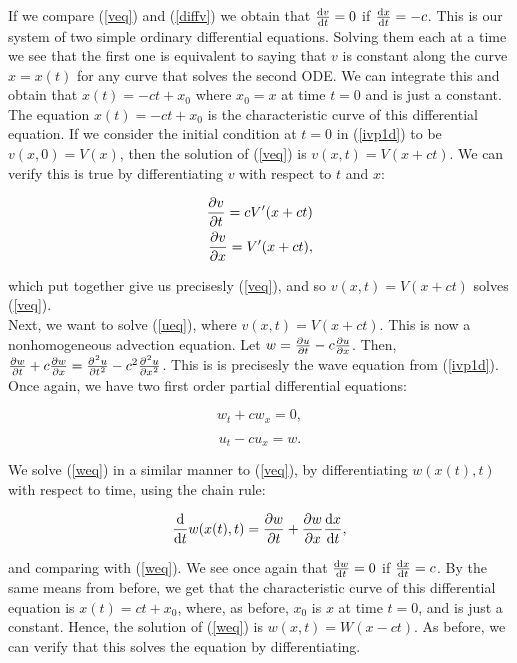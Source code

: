\documentclass[a4paper, 12pt]{article}
\numberwithin{equation}{section}
\begin{document}
If we compare (\ref{veq}) and (\ref{diffv}) we obtain that $\diff{v}{t}=0$ if $\diff{x}{t}=-c$. This is our system of two simple ordinary differential 
equations. Solving them each at a time we see that the first one is equivalent to saying that $v$ is constant along the curve $x=x(t)$ for any curve that 
solves the second ODE. We can integrate this and obtain that $x(t)=-ct+x_0$ where $x_0=x$ at time $t=0$ and is just a constant. The equation $x(t)=-ct+x_0$
is the characteristic curve of this differential equation. If we consider the initial condition at $t=0$ in (\ref{ivp1d}) to be $v(x,0)=V(x)$, then the 
solution of (\ref{veq}) is $v(x,t)=V(x+ct)$. We can verify this is true by differentiating $v$ with respect to $t$ and $x$:

\begin{equation*}
    \begin{aligned}
    \diffp[1]{v}{t}=cV'(x+ct)\\
    \diffp[1]{v}{x}=V'(x+ct),
    \end{aligned}
\end{equation*}

which put together give us precisesly (\ref{veq}), and so $v(x,t)=V(x+ct)$ solves (\ref{veq}).
\\

Next, we want to solve (\ref{ueq}), where $v(x,t)=V(x+ct)$. This is now a nonhomogeneous advection equation. Let $w=\diffp[1]{u}{t}-c\diffp{u}{x}$. Then, 
$\diffp[1]{w}{t}+c\diffp{w}{x}=\diffp[2]{u}{t}-c^2\diffp[2]{u}{x}$. This is is precisesly the wave equation from (\ref{ivp1d}). Once again, we have two first
order partial differential equations:

\begin{equation} 
    \label{weq}
    w_t+cw_x=0, 
\end{equation}

\begin{equation}
    \label{ueqw}
    u_t-cu_x=w. 
\end{equation}

We solve (\ref{weq}) in a similar manner to (\ref{veq}), by differentiating $w(x(t),t)$ with respect to time, using the chain rule:

\begin{equation} \label{diffw}
    \diff{}{t}w(x(t),t)=\diffp[1]{w}{t}+\diffp[1]{w}{x}\diff{x}{t}, 
\end{equation}

and comparing with (\ref{weq}). We see once again that $\diff{w}{t}=0$ if $\diff{x}{t}=c$. By the same means from before, we get that the characteristic 
curve of this differential equation is $x(t)=ct+x_0$, where, as before, $x_0$ is $x$ at time $t=0$, and is just a constant. Hence, the solution of (\ref{weq})
is $w(x,t)=W(x-ct)$. As before, we can verify that this solves the equation by differentiating.
\end{document}
